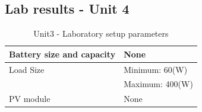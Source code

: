 \subsection{Lab results - Unit 4} 
\begin{table}[!ht]
	\begin{center}
		\caption{Unit3 - Laboratory setup parameters}
		\begin{tabular}{|p{6cm}|p{8cm}|} %
			\hline
			Battery size and capacity	& None\\
			\hline
			Load Size 					& Minimum: 60(W)\\
			& Maximum: 400(W)\\
			\hline
			PV module		 			& None\\
			\hline
		\end{tabular}
	\end{center}
\end{table}


